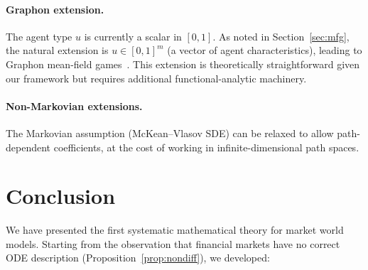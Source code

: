 \documentclass[12pt,a4paper]{article}
\theoremstyle{plain}
\theoremstyle{definition}
\newcommand{\1}{\mathbbm{1}}
\begin{document}
\paragraph{Graphon extension.}
The agent type $u$ is currently a scalar in $[0,1]$.  As noted in
Section~\ref{sec:mfg}, the natural extension is $u \in [0,1]^m$ (a vector of
agent characteristics), leading to Graphon mean-field games~\citep{CarmonaGraphon2022}.
This extension is theoretically straightforward given our framework but requires
additional functional-analytic machinery.

\paragraph{Non-Markovian extensions.}
The Markovian assumption (McKean--Vlasov SDE) can be relaxed to allow
path-dependent coefficients, at the cost of working in infinite-dimensional
path spaces.

\section{Conclusion}
\label{sec:conclusion}

We have presented the first systematic mathematical theory for market world
models. Starting from the observation that financial markets have no correct
ODE description (Proposition~\ref{prop:nondiff}), we developed:
\end{document}
